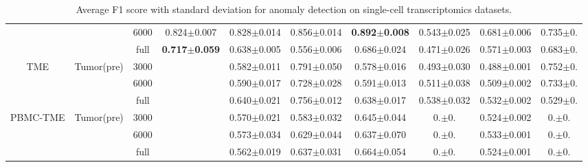 \documentclass{article}
\begin{document}
\begin{table}
{\begin{tabular}{cccccccccc}
        & & 6000 & 0.824$\pm$0.007 & 0.828$\pm$0.014 & 0.856$\pm$0.014 & \textbf{0.892$\pm$0.008} & 0.543$\pm$0.025 & 0.681$\pm$0.006 & 0.735$\pm$0. \\
        & & full & \textbf{0.717$\pm$0.059} & 0.638$\pm$0.005 & 0.556$\pm$0.006 & 0.686$\pm$0.024 & 0.471$\pm$0.026 & 0.571$\pm$0.003 & 0.683$\pm$0. \\
        \hline
        \multirow{3}{*}{\centering TME} & \multirow{3}{*}{\centering Tumor(pre)} & 3000 & & 0.582$\pm$0.011 & 0.791$\pm$0.050 & 0.578$\pm$0.016 & 0.493$\pm$0.030 & 0.488$\pm$0.001 & 0.752$\pm$0. \\
        & & 6000 & & 0.590$\pm$0.017 & 0.728$\pm$0.028 & 0.591$\pm$0.013 & 0.511$\pm$0.038 & 0.509$\pm$0.002 & 0.733$\pm$0. \\
        & & full & & 0.640$\pm$0.021 & 0.756$\pm$0.012 & 0.638$\pm$0.017 & 0.538$\pm$0.032 & 0.532$\pm$0.002 & 0.529$\pm$0. \\
        \hline
        \multirow{3}{*}{\centering PBMC-TME} & \multirow{3}{*}{\centering Tumor(pre)} & 3000 & & 0.570$\pm$0.021 & 0.583$\pm$0.032 & 0.645$\pm$0.044 & 0.$\pm$0. & 0.524$\pm$0.002 & 0.$\pm$0.  \\
        & & 6000 & & 0.573$\pm$0.034 & 0.629$\pm$0.044 & 0.637$\pm$0.070 & 0.$\pm$0. & 0.533$\pm$0.001 & 0.$\pm$0. \\
        & & full & & 0.562$\pm$0.019 & 0.637$\pm$0.031 & 0.664$\pm$0.054 & 0.$\pm$0. & 0.524$\pm$0.001 & 0.$\pm$0. \\
        \hline
    \end{tabular}
    }
    \caption{Average F1 score with standard deviation for anomaly detection on single-cell transcriptomics datasets.}
    \label{tab:plain}
\end{table}
\end{document}
